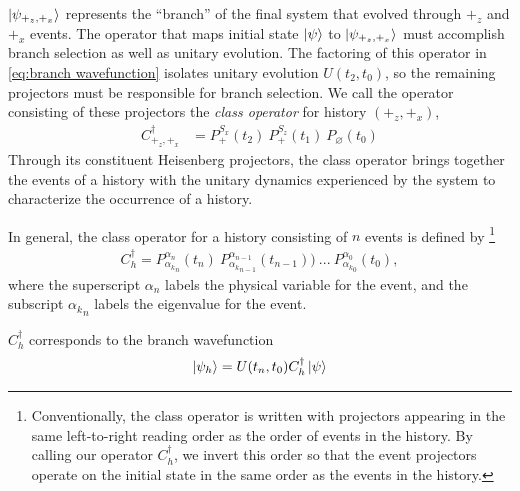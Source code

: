 $\ket{\psi_{+_z, +_x}}$ represents the ``branch'' of the final system that evolved through $+_z$ and $+_x$ events. The operator that maps initial state $\ket{\psi}$ to $\ket{\psi_{+_z, +_x}}$ must accomplish branch selection as well as unitary evolution. The factoring of this operator in \autoref{eq:branch wavefunction} isolates unitary evolution $U(t_2, t_0)$, so the remaining projectors must be responsible for branch selection. We call the operator consisting of these projectors the \textit{class operator} for history $\left(+_z, +_x\right)$,
\begin{align}
    C^\dagger_{+_z, +_x} &= {P^{S_x}_+(t_2)} \: {P^{S_z}_+(t_1)} \: {P_\varnothing(t_0)}
\end{align}
Through its constituent Heisenberg projectors, the class operator brings together the events of a history with the unitary dynamics experienced by the system to characterize the occurrence of a history.

In general, the class operator for a history consisting of $n$ events is defined by \footnote{Conventionally, the class operator is written with projectors appearing in the same left-to-right reading order as the order of events in the history. By calling our operator $C_h^\dagger$, we invert this order so that the event projectors operate on the initial state in the same order as the events in the history.}
\begin{align}
  C_h^\dagger = P^{\alpha_n}_{{\alpha_k}_n}(t_n) \: P^{\alpha_{n-1}}_{{\alpha_k}_{n-1}}(t_{n-1})) \: ... \: P^{\alpha_0}_{{\alpha_k}_0}(t_0),
\end{align}
where the superscript $\alpha_n$ labels the physical variable for the event, and the subscript ${\alpha_k}_n$ labels the eigenvalue for the event.

$C_h^\dagger$ corresponds to the branch wavefunction
\begin{align}
  \ket{\psi_h} = U(t_n, t_0) C_h^\dagger \ket{\psi}
\end{align}

